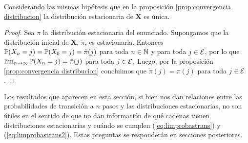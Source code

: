 \begin{corollary}
    Considerando las mismas hipótesis que en la proposición \ref{prop:convergencia distribucion} la distribución estacionaria de $\bm X$ es única.
\end{corollary}

\begin{proof}
    Sea $\pi$ la distribución estacionaria del enunciado. Supongamos que la distribución inicial de $\bm X$, $\tilde\pi$, es estacionaria. Entonces $\mathbb{P}(X_n = j) = \mathbb{P}(X_0 = j) = \tilde\pi(j)$ para toda $n \in \mathbb{N}$ y para toda $j \in \mathcal{E}$, por lo que $\lim_{n \to \infty} \mathbb{P}(X_n = j) = \tilde\pi(j)$ para toda $j \in \mathcal{E}$. Luego, por la proposición \ref{prop:convergencia distribucion} concluimos que $\tilde\pi(j) = \pi(j)$ para toda $j \in \mathcal{E}$.
\end{proof}

Los resultados que aparecen en esta sección, si bien nos dan relaciones entre las probabilidades de transición a $n$ pasos y las distribuciones estacionarias, no son útiles en el sentido de que no dan información de qué cadenas tienen distribuciones estacionarias y cuándo se cumplen (\ref{eq:limprobastrans}) y (\ref{eq:limprobastrans2}). Estas preguntas se responderán en secciones posteriores.